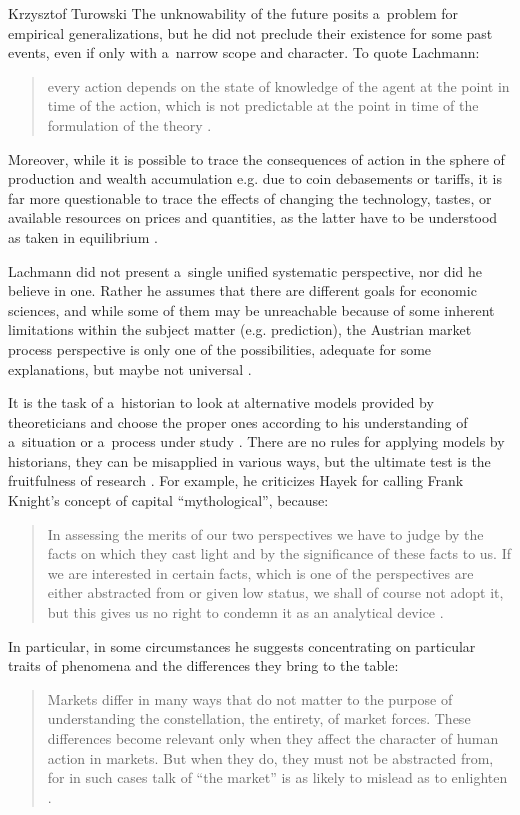 \begin{artengenv}{Krzysztof Turowski}
The unknowability of the future posits a~problem for empirical generalizations, but he did not preclude their existence for some past events, even if only with a~narrow scope and character. To quote Lachmann:
\begin{quote}
every action depends on the state of knowledge of the agent at the point in time of the action, which is not predictable at the point in time of the formulation of the theory \parencite[61]{lachmann-significance}.
\end{quote}
Moreover, while it is possible to trace the consequences of action in the sphere of production and wealth accumulation e.g. due to coin debasements or tariffs, it is far more questionable to trace the effects of changing the technology, tastes, or available resources on prices and quantities, as the latter have to be understood as taken in equilibrium \parencite[32--33]{lachmann1986market}.

Lachmann did not present a~single unified systematic perspective, nor did he believe in one. Rather he assumes that there are different goals for economic sciences, and while some of them may be unreachable because of some inherent limitations within the subject matter (e.g. prediction), the Austrian market process perspective is only one of the possibilities, adequate for some explanations, but maybe not universal \parencite[41]{lachmann1986market}.

It is the task of a~historian to look at alternative models provided by theoreticians and choose the proper ones according to his understanding of a~situation or a~process under study \parencite[179]{lachmann-science}. There are no rules for applying models by historians, they can be misapplied in various ways, but the ultimate test is the fruitfulness of research \parencite[175]{lachmann-science}.
For example, he criticizes Hayek for calling Frank Knight's concept of capital ``mythological'', because:
\begin{quote}
In assessing the merits of our two perspectives we have to judge by the facts on which they cast light and by the significance of these facts to us. If we are interested in certain facts, which is one of the perspectives are either abstracted from or given low status, we shall of course not adopt it, but this gives us no right to condemn it as an analytical device \parencite[175]{lachmann-salvage}.
\end{quote}
In particular, in some circumstances he suggests concentrating on particular traits of phenomena and the differences they bring to the table:
\begin{quote}
Markets differ in many ways that do not matter to the purpose of understanding the constellation, the entirety, of market forces. These differences become relevant only when they affect the character of human action in markets. But when they do, they must not be abstracted from, for in such cases talk of ``the market'' is as likely to mislead as to enlighten \parencite[271]{lachmann-speculative-markets}.
\end{quote}


\end{artengenv}
